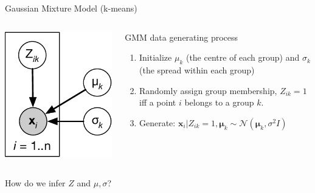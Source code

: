 \documentclass[
  ignorenonframetext,
  aspectratio=169]{beamer}
\begin{document}
\begin{frame}{Gaussian Mixture Model (k-means)}
\protect\hypertarget{gaussian-mixture-model-k-means}{}
\begin{columns}[T]
\begin{column}{.4\textwidth}
\scriptsize

\begin{center}\includegraphics[width=.7\linewidth]{./Vis/unsupervised/GMM_graphical_model} \end{center}

\normalsize
\end{column}

\begin{column}{.5\textwidth}
\begin{block}{GMM data generating process}
\protect\hypertarget{gmm-data-generating-process}{}
\begin{enumerate}
\item
  Initialize \(\mu_{k}\) (the centre of each group) and \(\sigma_{k}\)
  (the spread within each group)
\item
  Randomly assign group membership, \(Z_{ik} = 1\) iff a point \(i\)
  belongs to a group \(k\).
\item
  Generate:
  \(\mathbf{x}_{i} | Z_{ik} = 1, \boldsymbol{\mu}_{k} \sim \mathcal{N}\!\left(\boldsymbol{\mu}_{k}, \sigma^{2}I\right)\)
\end{enumerate}
\end{block}
\end{column}
\end{columns}

How do we infer \(Z\) and \(\mu,\sigma\)?
\end{frame}
\end{document}
